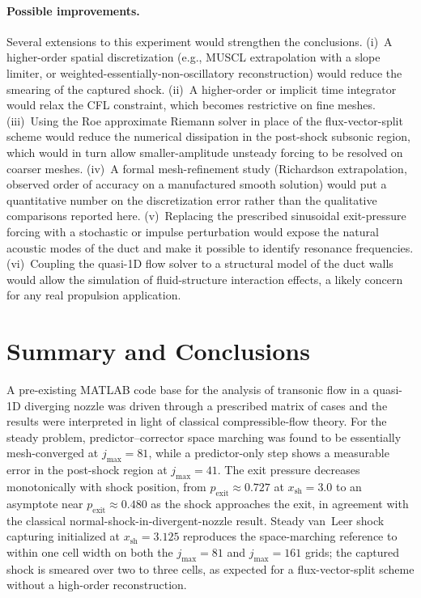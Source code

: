 \paragraph{Possible improvements.}
Several extensions to this experiment would strengthen the conclusions. (i)~A higher-order spatial discretization (e.g., MUSCL extrapolation with a slope limiter, or weighted-essentially-non-oscillatory reconstruction) would reduce the smearing of the captured shock. (ii)~A higher-order or implicit time integrator would relax the CFL constraint, which becomes restrictive on fine meshes. (iii)~Using the Roe approximate Riemann solver in place of the flux-vector-split scheme would reduce the numerical dissipation in the post-shock subsonic region, which would in turn allow smaller-amplitude unsteady forcing to be resolved on coarser meshes. (iv)~A formal mesh-refinement study (Richardson extrapolation, observed order of accuracy on a manufactured smooth solution) would put a quantitative number on the discretization error rather than the qualitative comparisons reported here. (v)~Replacing the prescribed sinusoidal exit-pressure forcing with a stochastic or impulse perturbation would expose the natural acoustic modes of the duct and make it possible to identify resonance frequencies. (vi)~Coupling the quasi-1D flow solver to a structural model of the duct walls would allow the simulation of fluid-structure interaction effects, a likely concern for any real propulsion application.

\section{Summary and Conclusions} \label{sec:summary}

A pre-existing MATLAB code base for the analysis of transonic flow in a quasi-1D diverging nozzle was driven through a prescribed matrix of cases and the results were interpreted in light of classical compressible-flow theory. For the steady problem, predictor--corrector space marching was found to be essentially mesh-converged at \(j_\text{max} = 81\), while a predictor-only step shows a measurable error in the post-shock region at \(j_\text{max} = 41\). The exit pressure decreases monotonically with shock position, from \(p_\text{exit} \approx 0.727\) at \(x_\text{sh} = 3.0\) to an asymptote near \(p_\text{exit} \approx 0.480\) as the shock approaches the exit, in agreement with the classical normal-shock-in-divergent-nozzle result. Steady van~Leer shock capturing initialized at \(x_\text{sh} = 3.125\) reproduces the space-marching reference to within one cell width on both the \(j_\text{max} = 81\) and \(j_\text{max} = 161\) grids; the captured shock is smeared over two to three cells, as expected for a flux-vector-split scheme without a high-order reconstruction.

